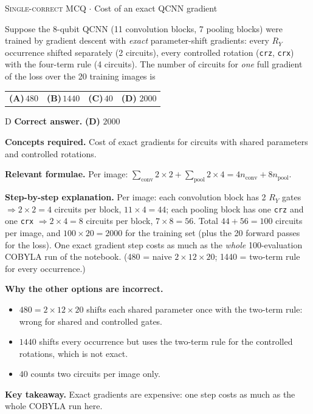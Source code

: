 \documentclass[11pt,a4paper]{article}
\newcommand{\optlabel}[1]{\textbf{(#1)}}
\newcommand{\correctlabel}[1]{\textcolor{okgreen}{\textbf{(#1)}\,\ding{51}}}
\newenvironment{qitem}[1]{\begin{list}{}{\setlength{\leftmargin}{3.3em}\setlength{\labelwidth}{3.1em}%
  \setlength{\labelsep}{0.2em}\setlength{\topsep}{3pt}\setlength{\parsep}{3pt}}\item[\textbf{Q.#1}\hfill]}{\end{list}}
\newcommand{\qsep}{\par\vspace{2pt}{\color{black!15}\hrule}\vspace{4pt}}
\newcommand{\qmeta}[2]{{\footnotesize\color{black!60}\textsc{#1} \;$\cdot$\; #2}\par}
\begin{document}
\begin{qitem}{66}
\qmeta{Single-correct MCQ}{Cost of an exact QCNN gradient}
Suppose the 8-qubit QCNN (11 convolution blocks, 7 pooling blocks) were trained by gradient descent with \emph{exact}
parameter-shift gradients: every $R_Y$ occurrence shifted separately (2 circuits), every controlled rotation (\texttt{crz}, \texttt{crx})
with the four-term rule (4 circuits). The number of circuits for \emph{one} full gradient of the loss over the 20 training images is
\par\smallskip\noindent\begin{tabularx}{\linewidth}{@{}*{4}{L}@{}}
\optlabel{A}\,$480$ & \optlabel{B}\,$1440$ & \optlabel{C}\,$40$ & \correctlabel{D}\,$2000$
\end{tabularx}
\end{qitem}
\begin{solbox}{D}
\textbf{\color{brand}Correct answer.} \textcolor{okgreen}{\textbf{(D)}} $2000$

\textbf{\color{brand}Concepts required.} Cost of exact gradients for circuits with shared parameters and controlled rotations.

\textbf{\color{brand}Relevant formulae.} Per image: $\sum_{\text{conv}}2\times2 + \sum_{\text{pool}}2\times4 = 4n_{\text{conv}} + 8n_{\text{pool}}$.

\textbf{\color{brand}Step-by-step explanation.} Per image: each convolution block has 2 $R_Y$ gates $\Rightarrow 2\times2 = 4$ circuits per block, $11\times4 = 44$; each pooling block has one
\texttt{crz} and one \texttt{crx} $\Rightarrow 2\times4 = 8$ circuits per block, $7\times8 = 56$. Total $44 + 56 = 100$ circuits per image, and
$100\times20 = 2000$ for the training set (plus the 20 forward passes for the loss). One exact gradient step costs as much as the
\emph{whole} 100-evaluation COBYLA run of the notebook. (480 = naive $2\times12\times20$; 1440 = two-term rule for every occurrence.)

\textbf{\color{brand}Why the other options are incorrect.}
\begin{itemize}[leftmargin=2.4em, itemsep=1pt, topsep=2pt]
\item[\textbf{(A)}] $480 = 2\times12\times20$ shifts each shared parameter once with the two-term rule: wrong for shared and controlled gates.
\item[\textbf{(B)}] $1440$ shifts every occurrence but uses the two-term rule for the controlled rotations, which is not exact.
\item[\textbf{(C)}] $40$ counts two circuits per image only.
\end{itemize}
\textbf{\color{brand}Key takeaway.} Exact gradients are expensive: one step costs as much as the whole COBYLA run here.
\end{solbox}
\qsep
\end{document}

